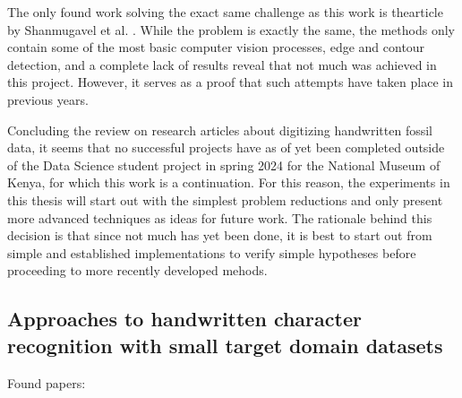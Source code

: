 \documentclass{article}
\begin{document}
The only found work solving the exact same challenge as this work is thearticle by Shanmugavel et al. \cite{shanmugavelHandwrittenOpticalCharacter2018}.
While the problem is exactly the same, the methods only contain some of the most basic computer 
vision processes, edge and contour detection, and a complete lack of results reveal that not much was achieved in 
this project. However, it serves as a proof that such attempts have taken place in previous years.

Concluding the review on research articles about digitizing handwritten fossil data, it seems that no successful projects
have as of yet been completed outside of the Data Science student project in spring 2024 for the National 
Museum of Kenya, for which this work is a continuation. For this reason, the experiments in this thesis will 
start out with the simplest problem reductions and only present more advanced techniques as ideas for future work.
The rationale behind this decision is that since not much has yet been done, it is best to start out from 
simple and established implementations to verify simple hypotheses before proceeding to more recently developed mehods.

\subsection{Approaches to handwritten character recognition with small target domain datasets}
\label{sect:same_solution}

Found papers:

\cite{akhlaghiFarsiHandwrittenPhone2020} \cite{chatterjeeBengaliHandwrittenCharacter2020} \cite{thuonImprovingIsolatedGlyph2022}
\cite{goelHandwrittenGujaratiNumerals2023} \cite{goelPreTrainedCNNBased2022} \cite{limbachiyaIdentificationHandwrittenGujarati2022}
\cite{rasheedHandwrittenUrduCharacters2022} \cite{rizkyTextRecognitionImages2023} \cite{shoponBanglaHandwrittenDigit2016}
\cite{zunairUnconventionalWisdomNew2018} \cite{zhaoIncrementalRecognitionMultiStyle2024}
\end{document}

